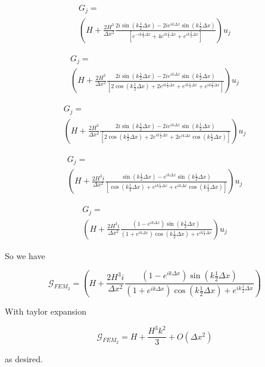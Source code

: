 \documentclass[12pt]{article}
\begin{document}
\begin{multline}
G_j= \\ \left( H  +  \frac{2H^3}{\Delta x^2}\frac{2i\sin\left(k \frac{1}{2}\Delta x\right) -  2ie^{ik\Delta x}\sin\left(k \frac{1}{2}\Delta x\right) }{\left[e^{- ik \frac{1}{2}\Delta x} + 4 e^{ik \frac{1}{2}\Delta x}  +  e^{ik \frac{3}{2}\Delta x}  \right]} \right)u_j
\end{multline}

\begin{multline}
G_j= \\ \left( H  +  \frac{2H^3}{\Delta x^2}\frac{2i\sin\left(k \frac{1}{2}\Delta x\right) -  2ie^{ik\Delta x}\sin\left(k \frac{1}{2}\Delta x\right) }{\left[ 2\cos\left(k \frac{1}{2}\Delta x\right)+ 2 e^{ik \frac{1}{2}\Delta x} + e^{ik \frac{1}{2}\Delta x}  +  e^{ik \frac{3}{2}\Delta x}  \right]} \right)u_j
\end{multline}

\begin{multline}
G_j= \\ \left( H  +  \frac{2H^3}{\Delta x^2}\frac{2i\sin\left(k \frac{1}{2}\Delta x\right) -  2ie^{ik\Delta x}\sin\left(k \frac{1}{2}\Delta x\right) }{\left[ 2\cos\left(k \frac{1}{2}\Delta x\right)+ 2 e^{ik \frac{1}{2}\Delta x} + 2e^{ik\Delta x}\cos\left(k \frac{1}{2}\Delta x\right)  \right]} \right)u_j
\end{multline}

\begin{multline}
G_j= \\ \left( H  +  \frac{2H^3 i}{\Delta x^2}\frac{\sin\left(k \frac{1}{2}\Delta x\right) -  e^{ik\Delta x}\sin\left(k \frac{1}{2}\Delta x\right) }{\left[\cos\left(k \frac{1}{2}\Delta x\right)+ e^{ik \frac{1}{2}\Delta x} + e^{ik\Delta x}\cos\left(k \frac{1}{2}\Delta x\right)  \right]} \right)u_j
\end{multline}

\begin{multline}
G_j= \\ \left( H  +  \frac{2H^3 i}{\Delta x^2}\frac{\left(1 -e^{ik\Delta x} \right)\sin\left(k \frac{1}{2}\Delta x\right) }{\left(1  + e^{ik\Delta x} \right)\cos\left(k \frac{1}{2}\Delta x\right)+ e^{ik \frac{1}{2}\Delta x} } \right)u_j
\end{multline}

So we have

\[\mathcal{G}_{FEM_2} = \left( H  +  \frac{2H^3 i}{\Delta x^2}\frac{\left(1 -e^{ik\Delta x} \right)\sin\left(k \frac{1}{2}\Delta x\right) }{\left(1  + e^{ik\Delta x} \right)\cos\left(k \frac{1}{2}\Delta x\right)+ e^{ik \frac{1}{2}\Delta x} } \right) \]

With taylor expansion

\[\mathcal{G}_{FEM_2} = H + \frac{H^3k^2}{3} + O(\Delta x ^2)\]

as desired.
\end{document}
